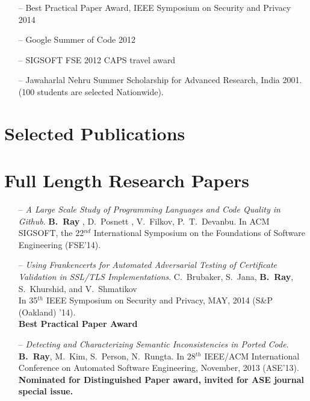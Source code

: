 \documentclass[overlapped,line,letterpaper, 12pt]{res}
\begin{document}
\begin{resume}
\begin{itemize}
\item[--]
Best Practical Paper Award, IEEE Symposium on Security and Privacy 2014
\item[--]
Google Summer of Code 2012 %
\item[--]
SIGSOFT FSE 2012 CAPS travel award 
\item[--]
Jawaharlal Nehru Summer Scholarship for Advanced Research, India 2001.
 (100 students are selected Nationwide).
\end{itemize}

\section{Selected Publications}
\vspace{-0.05cm}
\section{\small Full Length Research Papers}

\begin{itemize}
\item[--]
{\em A Large Scale Study of Programming Languages and Code Quality in Github}. 
{\bf B.~Ray} , D.~Posnett , V.~Filkov, P.~T.~Devanbu. 
{\small In ACM SIGSOFT, the 22$^{nd}$ International Symposium on the Foundations of Software Engineering
(FSE'14).} \\

\item[--]
{\em Using Frankencerts for Automated Adversarial Testing of Certificate Validation in SSL/TLS Implementations}. 
C.~Brubaker, S.~Jana, {\bf B.~Ray}, S.~Khurshid, and V.~Shmatikov \\
{\small In 35$^{th}$ IEEE Symposium on Security and Privacy, MAY, 2014 (S\&P (Oakland) '14).}\\
\textbf{\small Best Practical Paper Award}


\item[--]
{\em Detecting and Characterizing Semantic Inconsistencies in Ported Code}. 
{\bf B.~Ray}, M.~Kim, S.~Person, N.~Rungta.
{\small In 28$^{th}$ IEEE/ACM International Conference on Automated Software Engineering, 
November, 2013 (ASE'13).}
\textbf{\small Nominated for Distinguished Paper award, invited for ASE journal special issue.}



\end{itemize}
\end{resume}
\end{document}
